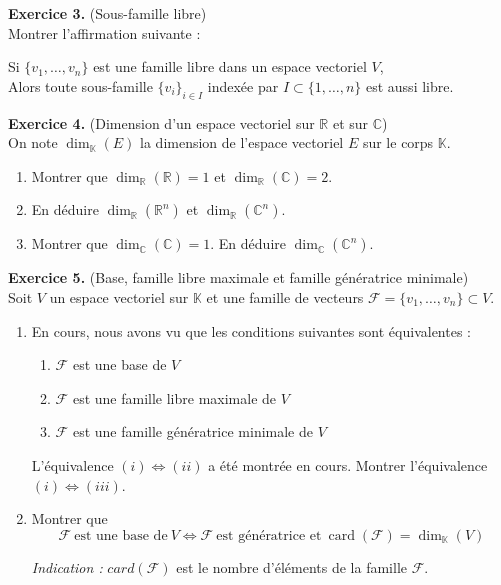 \documentclass[a4paper, 10pt]{report}
\DeclareMathOperator{\card}{card}
\begin{document}
		\vspace{5mm}
	\noindent
	\textbf{Exercice 3.} (Sous-famille libre)\\
	Montrer l'affirmation suivante :
	
	Si $\{v_1, \dotsc, v_n\}$ est une famille libre dans un espace
	vectoriel $V$,\\ \indent
	Alors toute sous-famille $\{v_i\}_{i \in I}$ indexée par 
	$I \subset \{1, \dotsc, n\}$ est aussi libre.	
	
	\vspace{5mm}
	\noindent
	\textbf{Exercice 4.} (Dimension d'un espace vectoriel sur
	$\mathbb{R}$ et sur $\mathbb{C}$)\\
	On note $\dim_{\mathbb{K}}(E)$ la dimension de l'espace vectoriel
	$E$ sur le corps $\mathbb{K}$.
	
	\begin{enumerate}[label=(\alph*)]
		\item Montrer que $\dim_{\mathbb{R}}(\mathbb{R}) = 1$ et
		$\dim_{\mathbb{R}}(\mathbb{C}) = 2$.
		\item En déduire $\dim_{\mathbb{R}}(\mathbb{R}^n)$ et
		$\dim_{\mathbb{R}}(\mathbb{C}^n)$.
		\item Montrer que $\dim_{\mathbb{C}}(\mathbb{C}) = 1$.
		En déduire $\dim_{\mathbb{C}}(\mathbb{C}^n)$.
	\end{enumerate}
	
	\vspace{5mm}
	\noindent
	\textbf{Exercice 5.} (Base, famille libre maximale et famille
	génératrice minimale)\\
	Soit $V$ un espace vectoriel sur $\mathbb{K}$ et une famille
	de vecteurs $\mathcal{F} = \{v_1, \dotsc, v_n\} \subset V$.
	
	\begin{enumerate}[label=(\alph*)]
		\item En cours, nous avons vu que les conditions suivantes
		sont équivalentes :
		\begin{enumerate}[label=(\roman*)]
			\item $\mathcal{F}$ est une base de $V$
			\item $\mathcal{F}$ est une famille
				libre maximale de $V$
			\item $\mathcal{F}$ est une famille
				génératrice minimale de $V$
		\end{enumerate}
		L'équivalence $(i) \iff (ii)$ a été montrée en cours.
		Montrer l'équivalence $(i) \iff (iii)$.
		\item Montrer que
		\[
			\mathcal{F}\ \text{est une base de}\ V \iff
			\mathcal{F}\ \text{est génératrice et}\
			\card(\mathcal{F}) = \dim_{\mathbb{K}}(V)
		\]
		
		\textit{Indication :} $card(\mathcal{F})$ est le nombre
		d'éléments de la famille $\mathcal{F}$.
	\end{enumerate}
	
	\newpage
	
	\fancyhf{}
	\renewcommand{\headrule}
	{\rule{\textwidth}{0pt}}
	
\end{document}
